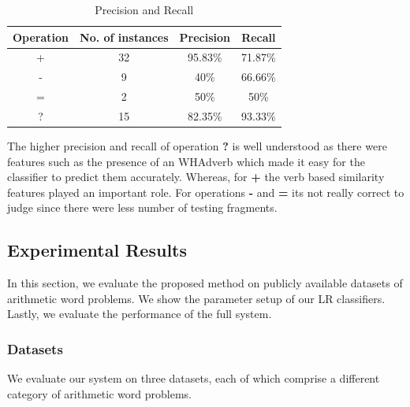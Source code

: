 \documentclass[11pt]{article}
\begin{document}
\begin{table}[h]
\begin{center}
\begin{tabular}{|c|c|c|c|}
\hline
\bf Operation & \bf No. of instances & \bf Precision & \bf Recall \\
\hline
+ & 32 & 95.83\% & 71.87\% \\
\hline
- & 9 & 40\% & 66.66\% \\
\hline
= & 2 & 50\% & 50\% \\
\hline
? & 15 & 82.35\% & 93.33\% \\
\hline
\end{tabular}
\end{center}
\label{figure:22}
\caption{Precision and Recall}
\end{table}

The higher precision and recall of operation \textbf{?} is well understood as there were features such as the presence of an WHAdverb which made it easy for the classifier to predict them accurately. Whereas, for \textbf{+} the verb based similarity features played an important role. For operations \textbf{-} and \textbf{=} its not really correct to judge since there were less number of testing fragments.

\subsection{Experimental Results}\label{sec:experimentalresults}
In this section, we evaluate the proposed method on publicly available datasets of arithmetic word problems. We show the parameter setup of our LR classifiers. Lastly, we evaluate the performance of the full system.

\subsubsection{Datasets}\label{sec:datasets}
We evaluate our system on three datasets, each of which comprise a different category of arithmetic word problems.
\end{document}

